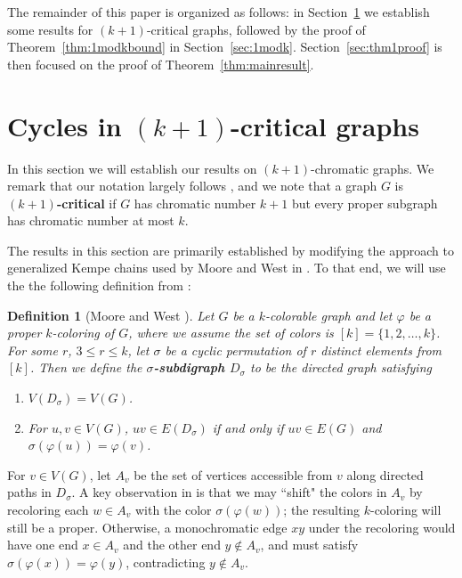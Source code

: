 \documentclass[12pt]{article}
\numberwithin{theorem}{section}
\newtheorem{definition}[theorem]{Definition}
\begin{document}
The remainder of this paper is organized as follows: in Section~\ref{sec:k+1general} we establish some results for $(k+1)$-critical graphs, followed by the proof of Theorem~\ref{thm:1modkbound} in Section~\ref{sec:1modk}.  Section~\ref{sec:thm1proof} is then focused on the proof of Theorem~\ref{thm:mainresult}.


\section{Cycles in $(k+1)$-critical graphs}
\label{sec:k+1general}

In this section we will establish our results on $(k+1)$-chromatic graphs. We remark that our notation largely follows \cite{WestCM}, and we note that a graph $G$ is {\bf $(k+1)$-critical} if $G$ has chromatic number $k+1$ but every proper subgraph has chromatic number at most $k$.

The results in this section are primarily established by modifying the approach to generalized Kempe chains used by Moore and West in \cite{MW}.  To that end, we will use the the following definition from \cite{MW}:


\begin{definition}[Moore and West \cite{MW}]
    Let $G$ be a $k$-colorable graph and let $\varphi$ be a proper $k$-coloring of $G$, where we assume the set of colors is $[k]=\{1,2,\ldots,k\}$.  For some $r$, $3 \le r \le k$, let $\sigma$ be a cyclic permutation of $r$ distinct elements from $[k]$. Then we define the {\bf $\sigma$-subdigraph $D_{\sigma}$} to be the directed graph satisfying
\begin{enumerate}
    \item $V(D_{\sigma})=V(G)$.
    \item For $u,v \in V(G)$, $uv \in E(D_{\sigma})$ if and only if $uv \in E(G)$ and $\sigma(\varphi(u)) = \varphi(v)$.
\end{enumerate}
\end{definition}


For $v \in V(G)$, let $A_v$ be the set of vertices accessible from $v$ along directed paths in $D_{\sigma}$. A key observation in \cite{MW} is that we may ``shift" the colors in $A_v$ by recoloring each $w \in A_v$ with the color $\sigma(\varphi(w))$; the resulting $k$-coloring will still be a proper. Otherwise, a monochromatic edge $xy$ under the recoloring would have one end $x \in A_v$ and the other end $y \notin A_v$, and must satisfy $\sigma(\varphi(x))=\varphi(y)$, contradicting $y \notin A_v$.
\end{document}
